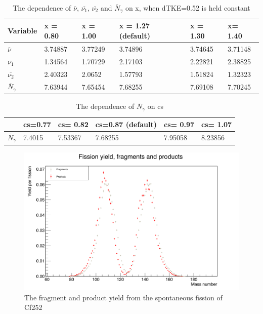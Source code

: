 \documentclass[]{article}
\begin{document}
\begin{table} [H]
	\centering
	\caption{The dependence of $\overline{\nu}$, $\overline{\nu_1}$, $\overline{\nu_2}$ and $\overline{N}_{\gamma}$ on x, when dTKE=0.52 is held constant}
	\begin{tabularx}{\textwidth}{XXXXXX} \hline
		\label{tab:dependence_on_x}
		Variable & x = 0.80 & x  = 1.00 & x = 1.27 (default) & x = 1.30 & x= 1.40\\ \hline
		$\overline{\nu}$ & 3.74887 & 3.77249 & 3.74896 & 3.74645 & 3.71148\\
		$\overline{\nu_1}$ & 1.34564 & 1.70729  & 2.17103 & 2.22821 & 2.38825 \\
		$\overline{\nu_2}$ & 2.40323  & 2.0652 & 1.57793 & 1.51824 & 1.32323 \\ 
		$\overline{N}_{\gamma}$ & 7.63944 & 7.65454 & 7.68255 & 7.69108 & 7.70245\\
		\hline
	\end{tabularx}
\end{table}

\begin{table} [H]
	\centering
	\caption{The dependence of  $\overline{N}_{\gamma}$ on cs}
	\begin{tabularx}{\textwidth}{XXXXXX} \hline
		\label{tab:dependence_on_c}
		 & cs=0.77 & cs= 0.82 & cs=0.87 (default) & cs= 0.97 & cs= 1.07 \\ \hline
		$\overline{N}_{\gamma}$ & 7.4015 & 7.53367 & 7.68255 & 7.95058 & 8.23856 \\
		\hline
	\end{tabularx}
\end{table}

\begin{figure} [H]
	\centering
	\includegraphics[scale=0.37]{Cf252_sf_fragment_product_yield.png}
	\caption{The fragment and product yield from the spontaneous fission of Cf252}
	\label{fig:Cf252_sf_fragment_product_yield}
\end{figure}
\end{document}
